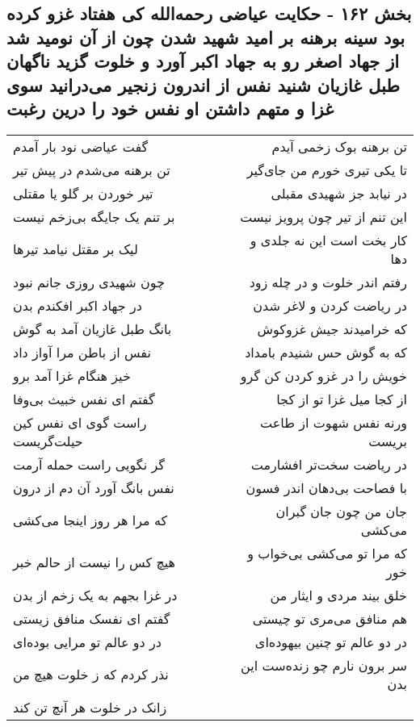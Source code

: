 \begin{center}
\section*{بخش ۱۶۲ - حکایت عیاضی رحمه‌الله کی هفتاد غزو کرده بود سینه برهنه بر امید شهید شدن چون از آن نومید شد از جهاد اصغر رو به جهاد اکبر آورد و خلوت گزید ناگهان طبل غازیان شنید نفس از اندرون زنجیر می‌درانید سوی غزا و متهم داشتن او نفس خود را درین رغبت}
\label{sec:sh162}
\begin{longtable}{l p{0.5cm} r}
گفت عیاضی نود بار آمدم
&&
تن برهنه بوک زخمی آیدم
\\
تن برهنه می‌شدم در پیش تیر
&&
تا یکی تیری خورم من جای‌گیر
\\
تیر خوردن بر گلو یا مقتلی
&&
در نیابد جز شهیدی مقبلی
\\
بر تنم یک جایگه بی‌زخم نیست
&&
این تنم از تیر چون پرویز نیست
\\
لیک بر مقتل نیامد تیرها
&&
کار بخت است این نه جلدی و دها
\\
چون شهیدی روزی جانم نبود
&&
رفتم اندر خلوت و در چله زود
\\
در جهاد اکبر افکندم بدن
&&
در ریاضت کردن و لاغر شدن
\\
بانگ طبل غازیان آمد به گوش
&&
که خرامیدند جیش غزوکوش
\\
نفس از باطن مرا آواز داد
&&
که به گوش حس شنیدم بامداد
\\
خیز هنگام غزا آمد برو
&&
خویش را در غزو کردن کن گرو
\\
گفتم ای نفس خبیث بی‌وفا
&&
از کجا میل غزا تو از کجا
\\
راست گوی ای نفس کین حیلت‌گریست
&&
ورنه نفس شهوت از طاعت بریست
\\
گر نگویی راست حمله آرمت
&&
در ریاضت سخت‌تر افشارمت
\\
نفس بانگ آورد آن دم از درون
&&
با فصاحت بی‌دهان اندر فسون
\\
که مرا هر روز اینجا می‌کشی
&&
جان من چون جان گبران می‌کشی
\\
هیچ کس را نیست از حالم خبر
&&
که مرا تو می‌کشی بی‌خواب و خور
\\
در غزا بجهم به یک زخم از بدن
&&
خلق بیند مردی و ایثار من
\\
گفتم ای نفسک منافق زیستی
&&
هم منافق می‌مری تو چیستی
\\
در دو عالم تو مرایی بوده‌ای
&&
در دو عالم تو چنین بیهوده‌ای
\\
نذر کردم که ز خلوت هیچ من
&&
سر برون نارم چو زنده‌ست این بدن
\\
زانک در خلوت هر آنچ تن کند

\end{longtable}
\end{center}
